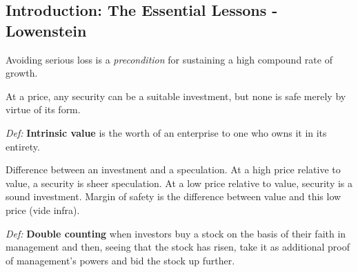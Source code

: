 \documentclass{article}
\newcommand*{\defn}[1]{\textit{Def:} \textbf{#1}}
\begin{document}
\subsection*{Introduction: The Essential Lessons - Lowenstein}
Avoiding serious loss is a \textit{precondition} for sustaining a high compound rate of growth.
\par
At a price, any security can be a suitable investment, but none is safe merely by virtue of its form.
\par
\defn{Intrinsic value} is the worth of an enterprise to one who owns it in its entirety.
\par
Difference between an investment and a speculation. At a high price relative to value, a security is sheer speculation. At a low price relative to value, security is a sound investment. Margin of safety is the difference between value and this low price (vide infra).
\par
\defn{Double counting} when investors buy a stock on the basis of their faith in management and then, seeing that the stock has risen, take it as additional proof of management's powers and bid the stock up further.
\end{document}
